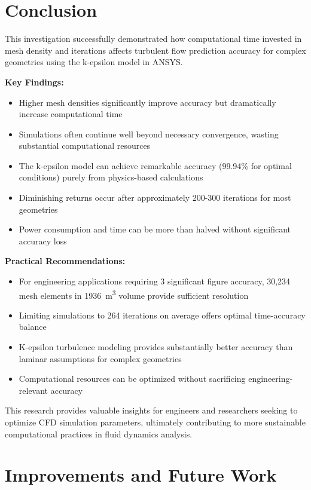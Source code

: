 \documentclass[12pt,a4paper]{article}
\begin{document}
\section{Conclusion}

This investigation successfully demonstrated how computational time invested in mesh density and iterations affects turbulent flow prediction accuracy for complex geometries using the k-epsilon model in ANSYS.

\textbf{Key Findings:}
\begin{itemize}
    \item Higher mesh densities significantly improve accuracy but dramatically increase computational time
    \item Simulations often continue well beyond necessary convergence, wasting substantial computational resources
    \item The k-epsilon model can achieve remarkable accuracy (99.94\% for optimal conditions) purely from physics-based calculations
    \item Diminishing returns occur after approximately 200-300 iterations for most geometries
    \item Power consumption and time can be more than halved without significant accuracy loss
\end{itemize}

\textbf{Practical Recommendations:}
\begin{itemize}
    \item For engineering applications requiring 3 significant figure accuracy, 30,234 mesh elements in \SI{1936}{\meter\cubed} volume provide sufficient resolution
    \item Limiting simulations to 264 iterations on average offers optimal time-accuracy balance
    \item K-epsilon turbulence modeling provides substantially better accuracy than laminar assumptions for complex geometries
    \item Computational resources can be optimized without sacrificing engineering-relevant accuracy
\end{itemize}

This research provides valuable insights for engineers and researchers seeking to optimize CFD simulation parameters, ultimately contributing to more sustainable computational practices in fluid dynamics analysis.

\section{Improvements and Future Work}
\end{document}
